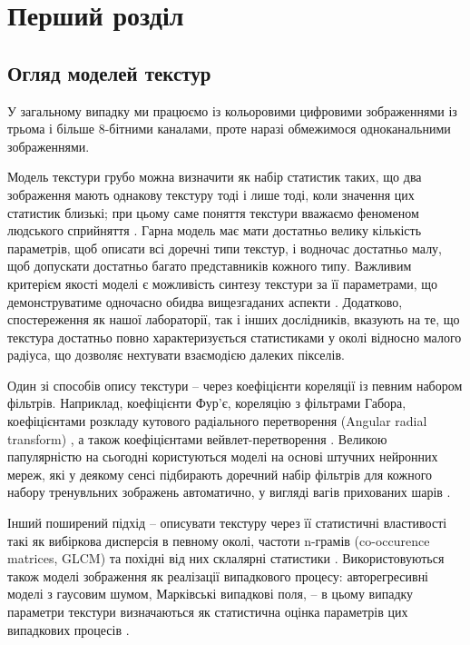 
\chapter{Перший розділ}\label{chapter1}

\section{Огляд моделей текстур}\label{section1.overview}

У загальному випадку ми працюємо із кольоровими цифровими зображеннями із трьома і більше 8-бітними каналами, 
проте наразі обмежимося одноканальними зображеннями.

Модель текстури грубо можна визначити як набір статистик таких, що два зображення мають однакову текстуру тоді і лише тоді, коли значення цих статистик близькі;
при цьому саме поняття текстури вважаємо феноменом людського сприйняття \cite{julesz1981}.
Гарна модель має мати достатньо велику кількість параметрів, щоб описати всі доречні типи текстур, 
і водночас достатньо малу, щоб допускати достатньо багато представників кожного типу.
Важливим критерієм якості моделі є можливість синтезу текстури за її параметрами, 
що демонструватиме одночасно обидва вищезгаданих аспекти \cite{simoncelli1998}. 
Додатково, спостереження як нашої лабораторії, так і інших дослідників, вказують на те, що текстура достатньо повно характеризується
статистиками у околі відносно малого радіуса, що дозволяє нехтувати взаємодією далеких пікселів.

Один зі способів опису текстури -- через коефіцієнти кореляції із певним набором фільтрів. 
Наприклад, коефіцієнти Фур'є, кореляцію з фільтрами Габора, коефіцієнтами розкладу 
кутового радіального перетворення (Angular radial transform) \cite{bober2001},
а також коефіцієнтами вейвлет-перетворення \cite{portilla2000}.
Великою папулярністю на сьогодні користуються моделі на основі штучних нейронних мереж, 
які у деякому сенсі підбирають доречний набір фільтрів для кожного набору тренувльних зображень автоматично, 
у вигляді вагів прихованих шарів \cite{Wang_2018_CVPR}.

Інший поширений підхід -- описувати текстуру через її статистичні властивості такі як вибіркова дисперсія в певному околі,
частоти n-грамів (co-occurence matrices, GLCM) та похідні від них склалярні статистики \cite{belsare2015}. 
Використовуються також моделі зображення як реалізації випадкового процесу: авторегресивні моделі з гаусовим шумом, 
Марківські випадкові поля, -- в цьому випадку параметри текстури визначаються як статистична оцінка параметрів цих випадкових процесів \cite{huawudeng2004, kashyap1986}. 

